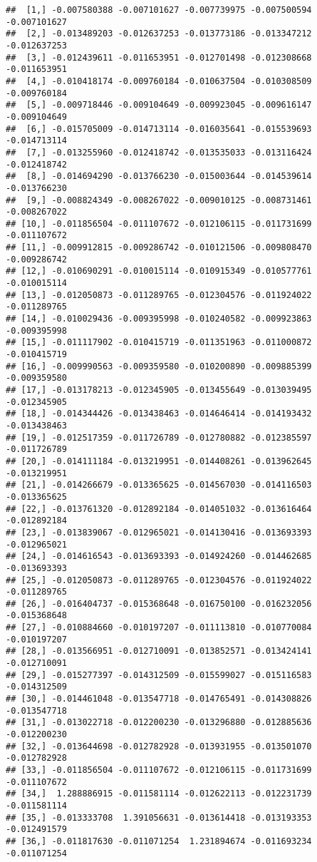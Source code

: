 \documentclass[
]{article}
\begin{document}
\begin{verbatim}
##  [1,] -0.007580388 -0.007101627 -0.007739975 -0.007500594 -0.007101627
##  [2,] -0.013489203 -0.012637253 -0.013773186 -0.013347212 -0.012637253
##  [3,] -0.012439611 -0.011653951 -0.012701498 -0.012308668 -0.011653951
##  [4,] -0.010418174 -0.009760184 -0.010637504 -0.010308509 -0.009760184
##  [5,] -0.009718446 -0.009104649 -0.009923045 -0.009616147 -0.009104649
##  [6,] -0.015705009 -0.014713114 -0.016035641 -0.015539693 -0.014713114
##  [7,] -0.013255960 -0.012418742 -0.013535033 -0.013116424 -0.012418742
##  [8,] -0.014694290 -0.013766230 -0.015003644 -0.014539614 -0.013766230
##  [9,] -0.008824349 -0.008267022 -0.009010125 -0.008731461 -0.008267022
## [10,] -0.011856504 -0.011107672 -0.012106115 -0.011731699 -0.011107672
## [11,] -0.009912815 -0.009286742 -0.010121506 -0.009808470 -0.009286742
## [12,] -0.010690291 -0.010015114 -0.010915349 -0.010577761 -0.010015114
## [13,] -0.012050873 -0.011289765 -0.012304576 -0.011924022 -0.011289765
## [14,] -0.010029436 -0.009395998 -0.010240582 -0.009923863 -0.009395998
## [15,] -0.011117902 -0.010415719 -0.011351963 -0.011000872 -0.010415719
## [16,] -0.009990563 -0.009359580 -0.010200890 -0.009885399 -0.009359580
## [17,] -0.013178213 -0.012345905 -0.013455649 -0.013039495 -0.012345905
## [18,] -0.014344426 -0.013438463 -0.014646414 -0.014193432 -0.013438463
## [19,] -0.012517359 -0.011726789 -0.012780882 -0.012385597 -0.011726789
## [20,] -0.014111184 -0.013219951 -0.014408261 -0.013962645 -0.013219951
## [21,] -0.014266679 -0.013365625 -0.014567030 -0.014116503 -0.013365625
## [22,] -0.013761320 -0.012892184 -0.014051032 -0.013616464 -0.012892184
## [23,] -0.013839067 -0.012965021 -0.014130416 -0.013693393 -0.012965021
## [24,] -0.014616543 -0.013693393 -0.014924260 -0.014462685 -0.013693393
## [25,] -0.012050873 -0.011289765 -0.012304576 -0.011924022 -0.011289765
## [26,] -0.016404737 -0.015368648 -0.016750100 -0.016232056 -0.015368648
## [27,] -0.010884660 -0.010197207 -0.011113810 -0.010770084 -0.010197207
## [28,] -0.013566951 -0.012710091 -0.013852571 -0.013424141 -0.012710091
## [29,] -0.015277397 -0.014312509 -0.015599027 -0.015116583 -0.014312509
## [30,] -0.014461048 -0.013547718 -0.014765491 -0.014308826 -0.013547718
## [31,] -0.013022718 -0.012200230 -0.013296880 -0.012885636 -0.012200230
## [32,] -0.013644698 -0.012782928 -0.013931955 -0.013501070 -0.012782928
## [33,] -0.011856504 -0.011107672 -0.012106115 -0.011731699 -0.011107672
## [34,]  1.288886915 -0.011581114 -0.012622113 -0.012231739 -0.011581114
## [35,] -0.013333708  1.391056631 -0.013614418 -0.013193353 -0.012491579
## [36,] -0.011817630 -0.011071254  1.231894674 -0.011693234 -0.011071254

\end{verbatim}
\end{document}
